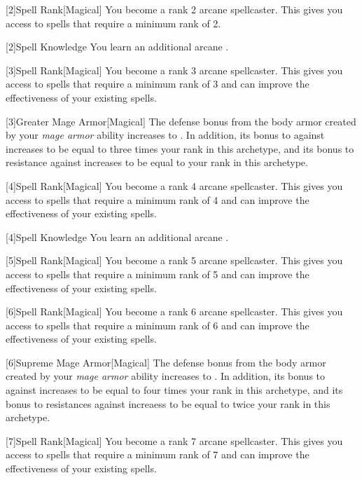         [2]{Spell Rank}[Magical] You become a rank 2 arcane spellcaster.
        This gives you access to spells that require a minimum rank of 2.

        [2]{Spell Knowledge} You learn an additional arcane .

        [3]{Spell Rank}[Magical] You become a rank 3 arcane spellcaster.
        This gives you access to spells that require a minimum rank of 3 and can improve the effectiveness of your existing spells.

        [3]{Greater Mage Armor}[Magical]
        The defense bonus from the body armor created by your \textit{mage armor} ability increases to .
        In addition, its bonus to  against  increases to be equal to three times your rank in this archetype, and its bonus to resistance against  increases to be equal to your rank in this archetype.

        [4]{Spell Rank}[Magical] You become a rank 4 arcane spellcaster.
        This gives you access to spells that require a minimum rank of 4 and can improve the effectiveness of your existing spells.

        [4]{Spell Knowledge} You learn an additional arcane .

        [5]{Spell Rank}[Magical] You become a rank 5 arcane spellcaster.
        This gives you access to spells that require a minimum rank of 5 and can improve the effectiveness of your existing spells.

        [6]{Spell Rank}[Magical] You become a rank 6 arcane spellcaster.
        This gives you access to spells that require a minimum rank of 6 and can improve the effectiveness of your existing spells.

        [6]{Supreme Mage Armor}[Magical]
        The defense bonus from the body armor created by your \textit{mage armor} ability increases to .
        In addition, its bonus to  against  increases to be equal to four times your rank in this archetype, and its bonus to resistances against  increaess to be equal to twice your rank in this archetype.

        [7]{Spell Rank}[Magical] You become a rank 7 arcane spellcaster.
        This gives you access to spells that require a minimum rank of 7 and can improve the effectiveness of your existing spells.

